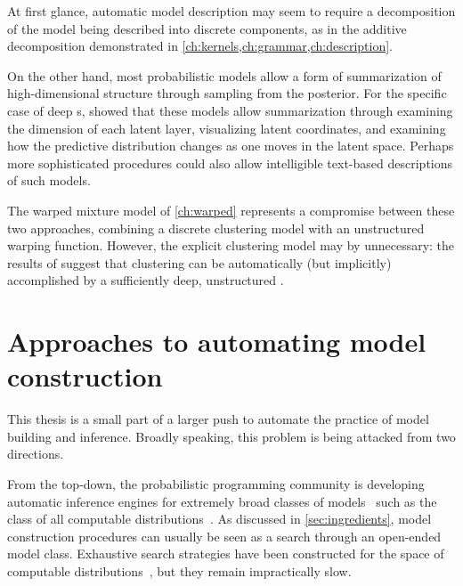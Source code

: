 \begin{itemize}
At first glance, automatic model description may seem to require a decomposition of the model being described into discrete components, as in the additive decomposition demonstrated in \cref{ch:kernels,ch:grammar,ch:description}.

On the other hand, most probabilistic models allow a form of summarization of high-dimensional structure through sampling from the posterior.
For the specific case of deep \gp{}s, \citet{damianou2012deep} showed that these models allow summarization through examining the dimension of each latent layer, visualizing latent coordinates, and examining how the predictive distribution changes as one moves in the latent space.
Perhaps more sophisticated procedures could also allow intelligible text-based descriptions of such models.

\end{itemize}

The warped mixture model of \cref{ch:warped} represents a compromise between these two approaches, combining a discrete clustering model with an unstructured warping function.
However, the explicit clustering model may by unnecessary: the results of \citet{damianou2012deep} suggest that clustering can be automatically (but implicitly) accomplished by a sufficiently deep, unstructured \gp{}.




\section{Approaches to automating model construction}
\label{top-down-vs-bottom-up}


This thesis is a small part of a larger push to automate the practice of model building and inference.
Broadly speaking, this problem is being attacked from two directions.

From the top-down, the probabilistic programming community is developing automatic inference engines for extremely broad classes of models~\citep{goodman2008church,mansinghka2014venture,Wood-AISTATS-2014,koller1997effective,milch20071,stan-software:2014} such as the class of all computable distributions~\citep{solomonoff1964formal, li2009introduction}.
As discussed in \cref{sec:ingredients}, model construction procedures can usually be seen as a search through an open-ended model class.
Exhaustive search strategies have been constructed for the space of computable distributions~\citep{hutter2002fastest,schmidhuber2002speed,levin1973universal}, but they remain impractically slow.

